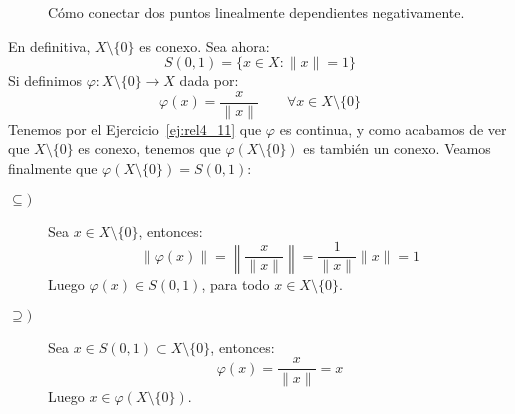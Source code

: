 \begin{ejercicio}
\begin{itemize}
\begin{itemize}
\begin{figure}[H]
\begin{tikzpicture}[scale=2]
            \end{tikzpicture}
            \caption{Cómo conectar dos puntos linealmente dependientes negativamente.}
        \end{figure}
        \end{itemize}
        En definitiva, $X\setminus \{0\}$ es conexo. Sea ahora:
        \begin{equation*}
            S(0,1) = \{x\in X : \|x\| = 1\}
        \end{equation*}
        Si definimos $\varphi:X\setminus \{0\} \to X$ dada por:
        \begin{equation*}
            \varphi(x) = \dfrac{x}{\|x\|} \qquad \forall x\in X\setminus\{0\}
        \end{equation*}
        Tenemos por el Ejercicio~\ref{ej:rel4_11} que $\varphi$ es continua, y como acabamos de ver que $X\setminus\{0\}$ es conexo, tenemos que $\varphi(X\setminus\{0\})$ es también un conexo. Veamos finalmente que $\varphi(X\setminus\{0\}) = S(0,1)$:
        \begin{description}
            \item [$\subseteq)$] Sea $x\in X\setminus\{0\}$, entonces:
                \begin{equation*}
                    \|\varphi(x)\| = \left\|\dfrac{x}{\|x\|}\right\| = \dfrac{1}{\|x\|} \|x\| = 1
                \end{equation*}
                Luego $\varphi(x) \in S(0,1)$, para todo $x\in X\setminus\{0\}$.
            \item [$\supseteq)$] Sea $x\in S(0,1)\subset X\setminus\{0\}$, entonces:
                \begin{equation*}
                    \varphi(x) = \dfrac{x}{\|x\|} = x
                \end{equation*}
                Luego $x\in \varphi(X\setminus \{0\})$.
        \end{description}
\end{itemize}
\end{ejercicio}
